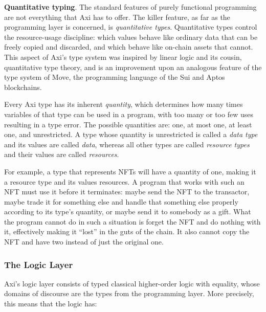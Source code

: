 \textbf{Quantitative typing}. The standard features of purely functional programming are not everything that Axi has to offer. The killer feature, as far as the programming layer is concerned, is \textit{quantitative types}. Quantitative types control the resource-usage discipline: which values behave like ordinary data that can be freely copied and discarded, and which behave like on-chain assets that cannot. This aspect of Axi's type system was inspired by linear logic and its cousin, quantitative type theory, and is an improvement upon an analogous feature of the type system of Move, the programming language of the Sui and Aptos blockchains.

Every Axi type has its inherent \textit{quantity}, which determines how many times variables of that type can be used in a program, with too many or too few uses resulting in a type error. The possible quantities are: one, at most one, at least one, and unrestricted. A type whose quantity is unrestricted is called a \textit{data type} and its values are called \textit{data}, whereas all other types are called \textit{resource types} and their values are called \textit{resources}.

For example, a type that represents NFTs will have a quantity of one, making it a resource type and its values resources. A program that works with such an NFT must use it before it terminates: maybe send the NFT to the transactor, maybe trade it for something else and handle that something else properly according to its type's quantity, or maybe send it to somebody as a gift. What the program cannot do in such a situation is forget the NFT and do nothing with it, effectively making it ``lost'' in the guts of the chain. It also cannot copy the NFT and have two instead of just the original one.

\subsubsection{The Logic Layer}

Axi's logic layer consists of typed classical higher-order logic with equality, whose domains of discourse are the types from the programming layer. More precisely, this means that the logic has:

